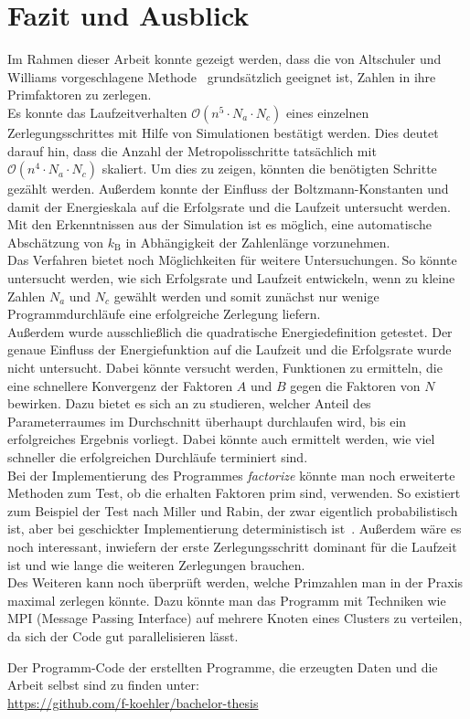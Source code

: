 \chapter{Fazit und Ausblick}\label{ch:conclusion}
Im Rahmen dieser Arbeit konnte gezeigt werden, dass die von Altschuler und Williams vorgeschlagene Methode~\parencite{altschuler} grundsätzlich geeignet ist, Zahlen in ihre Primfaktoren zu zerlegen. \\
Es konnte das Laufzeitverhalten $\mathcal{O}\left(n^5\cdot N_a \cdot N_c\right)$ eines einzelnen Zerlegungsschrittes mit Hilfe von Simulationen bestätigt werden. Dies deutet darauf hin, dass die Anzahl der Metropolisschritte tatsächlich mit $\mathcal{O}\left(n^4\cdot N_a\cdot N_c\right)$ skaliert. Um dies zu zeigen, könnten die benötigten Schritte gezählt werden. Außerdem konnte der Einfluss der Boltzmann-Konstanten und damit der Energieskala auf die Erfolgsrate und die Laufzeit untersucht werden. Mit den Erkenntnissen aus der Simulation ist es möglich, eine automatische Abschätzung von $k_\mathrm{B}$ in Abhängigkeit der Zahlenlänge vorzunehmen. \\
Das Verfahren bietet noch Möglichkeiten für weitere Untersuchungen. So könnte untersucht werden, wie sich Erfolgsrate und Laufzeit entwickeln, wenn zu kleine Zahlen $N_a$ und $N_c$ gewählt werden und somit zunächst nur wenige Programmdurchläufe eine erfolgreiche Zerlegung liefern. \\
Außerdem wurde ausschließlich die quadratische Energiedefinition getestet. Der genaue Einfluss der Energiefunktion auf die Laufzeit und die Erfolgsrate wurde nicht untersucht. Dabei könnte versucht werden, Funktionen zu ermitteln, die eine schnellere Konvergenz der Faktoren $A$ und $B$ gegen die Faktoren von $N$ bewirken. Dazu bietet es sich an zu studieren, welcher Anteil des Parameterraumes im Durchschnitt überhaupt durchlaufen wird, bis ein erfolgreiches Ergebnis vorliegt. Dabei könnte auch ermittelt werden, wie viel schneller die erfolgreichen Durchläufe terminiert sind.\\
Bei der Implementierung des Programmes \textit{factorize} könnte man noch erweiterte Methoden zum Test, ob die erhalten Faktoren prim sind, verwenden. So existiert zum Beispiel der Test nach Miller und Rabin, der zwar eigentlich probabilistisch ist, aber bei geschickter Implementierung deterministisch ist~\parencite{miller}. Außerdem wäre es noch interessant, inwiefern der erste Zerlegungsschritt dominant für die Laufzeit ist und wie lange die weiteren Zerlegungen brauchen. \\
Des Weiteren kann noch überprüft werden, welche Primzahlen man in der Praxis maximal zerlegen könnte. Dazu könnte man das Programm mit Techniken wie MPI (Message Passing Interface) auf mehrere Knoten eines Clusters zu verteilen, da sich der Code gut parallelisieren lässt.

\vfill
Der Programm-Code der erstellten Programme, die erzeugten Daten und die Arbeit selbst sind zu finden unter:\\
\url{https://github.com/f-koehler/bachelor-thesis}
